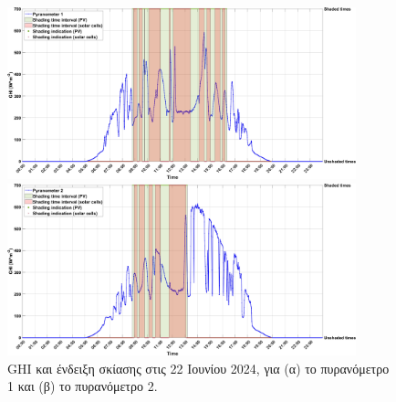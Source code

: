 \documentclass[12pt, a4paper]{report} %
\newcommand{\english}{\foreignlanguage{english}}
\begin{document}
\begin{figure}[H]
    \begin{minipage}{1\textwidth}
        \centering
        \includegraphics[width=0.9\textwidth]{GHI_1_22_06.jpg}
        \caption*{\hspace{35pt}(α)}{}
    \end{minipage}
    
    \medskip

    \begin{minipage}{1\textwidth}
        \centering
        \includegraphics[width=0.9\textwidth]{GHI_2_22_06.jpg}
        \caption*{\hspace{35pt}(β)}{}
    \end{minipage}
    \caption{\english{GHI} και ένδειξη σκίασης στις 22 Ιουνίου 2024, για (α) το πυρανόμετρο 1 και (β) το πυρανόμετρο 2.}
    \label{fig_GHI_22_jun}
\end{figure}
\end{document}
